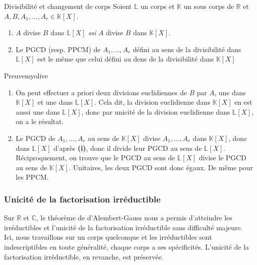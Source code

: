     \begin{prop}{Divisibilité et changement de corps}
        Soient $\mathbb{L}$ un corps et $\mathbb{K}$ un sous corps de $\mathbb{R}$ et $A,B,A_1,\ldots,A_r \in \mathbb{K}[X]$.
        \begin{enumerate}
            \item $A$ divise $B$ dans $\mathbb{L}[X]$ \textit{ssi} $A$ divise $B$ dans $\mathbb{K}[X]$.
            \item Le PGCD (resp. PPCM) de $A_1,\ldots,A_r$ défini au sens de la divisibilité dans $\mathbb{L}[X]$ est le même que celui défini au dens de la divisibilité dans $\mathbb{K}[X]$
        \end{enumerate}
    \end{prop}

    \begin{demo}{Preuve}{myolive}
        \begin{enumerate}
            \item On peut effectuer a priori deux divisions euclidiennes de $B$ par $A$, une dans $\mathbb{K}[X]$ et une dans $\mathbb{L}[X]$. Cela dit, la division euclidienne dans $\mathbb{K}[X]$ en est aussi une dans $\mathbb{L}[X]$, donc par unicité de la division euclidienne dans $\mathbb{L}[X]$, on a le résultat.
            \item Le PGCD de $A_1,\ldots,A_r$ au sens de $\mathbb{K}[X]$ divise $A_1,\ldots,A_r$ dans $\mathbb{K}[X]$, donc dans $\mathbb{L}[X]$ d’après \textbf{(i)}, donc il divide leur PGCD au sens de $\mathbb{L}[X]$. Réciproquement, on trouve que le PGCD au sens de $\mathbb{L}[X]$ divise le PGCD au sens de $\mathbb{K}[X]$. Unitaires, les deux PGCD sont donc égaux. De même pour les PPCM.
        \end{enumerate}
    \end{demo}

    \subsubsection{Unicité de la factorisation irréductible}

    Sur $\mathbb{R}$ et $\mathbb{C}$, le théorème de d’Alembert-Gauss nous a permis d’atteindre les irréductibles et l’unicité de la factorisation irréductible sans difficulté majeure. Ici, nous travaillons sur un corps quelconque et les irréductibles sont indescriptibles en toute généralité, chaque corps a ses spécificités. L’unicité de la factorisation irréductible, en revanche, est préservée.

